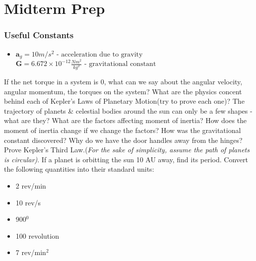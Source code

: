 \documentclass[9pt,addpoints]{exam}
\begin{document}
	\section*{Midterm Prep}
		\begin{center}
		\subsubsection*{Useful Constants}
		\begin{itemize}
			\item $\textbf{a}_g=10m/s^2\text{  - acceleration due to gravity}$\textbf{~}$\textbf{G} = 6.672\times10^{-12}\frac{Nm^2}{kg^2}\text{  - gravitational constant}$
		\end{itemize}
	\end{center}
	\begin{questions}
		\question If the net torque in a system is 0, what can we say about the angular velocity, angular momentum, the torques on the system? 
		\question What are the physics concent behind each of Kepler's Laws of Planetary Motion(try to prove each one)? 
		\question The trajectory of planets \& celestial bodies around the sun can only be a few shapes - what are they? 
		\question What are the factors affecting moment of inertia? How does the moment of inertia change if we change the factors?
		\question How was the gravitational constant discovered? 
		\question Why do we have the door handles away from the hinges?
		\question Prove Kepler's Third Law.(\textit{For the sake of simplicity, assume the path of planets is circular)}.
		\question If a planet is orbitting the sun 10 AU away, find its period.
		\question Convert the following quantities into their standard units:
		\begin{itemize}
			\item 2 rev/min
			\item 10 rev/s
			\item 900$^0$
			\item 100 revolution
			\item 7 rev/min$^2$
		\end{itemize}
	\end{questions}
	
\end{document}
